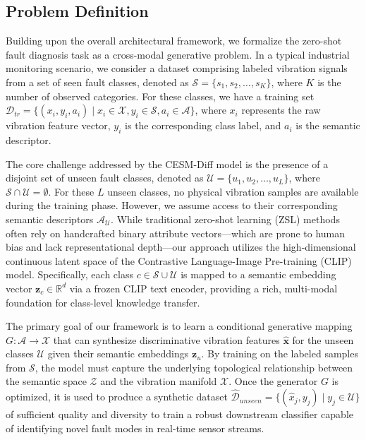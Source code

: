 \documentclass[journal,12pt,onecolumn]{IEEEtran}
\begin{document}
\subsection{Problem Definition}
Building upon the overall architectural framework, we formalize the zero-shot fault diagnosis task as a cross-modal generative problem. In a typical industrial monitoring scenario, we consider a dataset comprising labeled vibration signals from a set of seen fault classes, denoted as $\mathcal{S} = \{s_1, s_2, \dots, s_K\}$, where $K$ is the number of observed categories. For these classes, we have a training set $\mathcal{D}_{tr} = \{(x_i, y_i, a_i) \mid x_i \in \mathcal{X}, y_i \in \mathcal{S}, a_i \in \mathcal{A}\}$, where $x_i$ represents the raw vibration feature vector, $y_i$ is the corresponding class label, and $a_i$ is the semantic descriptor.

The core challenge addressed by the CESM-Diff model is the presence of a disjoint set of unseen fault classes, denoted as $\mathcal{U} = \{u_1, u_2, \dots, u_L\}$, where $\mathcal{S} \cap \mathcal{U} = \emptyset$. For these $L$ unseen classes, no physical vibration samples are available during the training phase. However, we assume access to their corresponding semantic descriptors $\mathcal{A}_{\mathcal{U}}$. While traditional zero-shot learning (ZSL) methods often rely on handcrafted binary attribute vectors—which are prone to human bias and lack representational depth—our approach utilizes the high-dimensional continuous latent space of the Contrastive Language-Image Pre-training (CLIP) model. Specifically, each class $c \in \mathcal{S} \cup \mathcal{U}$ is mapped to a semantic embedding vector $\mathbf{z}_c \in \mathbb{R}^d$ via a frozen CLIP text encoder, providing a rich, multi-modal foundation for class-level knowledge transfer.

The primary goal of our framework is to learn a conditional generative mapping $G: \mathcal{A} \to \mathcal{X}$ that can synthesize discriminative vibration features $\hat{\mathbf{x}}$ for the unseen classes $\mathcal{U}$ given their semantic embeddings $\mathbf{z}_u$. By training on the labeled samples from $\mathcal{S}$, the model must capture the underlying topological relationship between the semantic space $\mathcal{Z}$ and the vibration manifold $\mathcal{X}$. Once the generator $G$ is optimized, it is used to produce a synthetic dataset $\hat{\mathcal{D}}_{unseen} = \{(\hat{x}_j, y_j) \mid y_j \in \mathcal{U}\}$ of sufficient quality and diversity to train a robust downstream classifier capable of identifying novel fault modes in real-time sensor streams.
\end{document}
